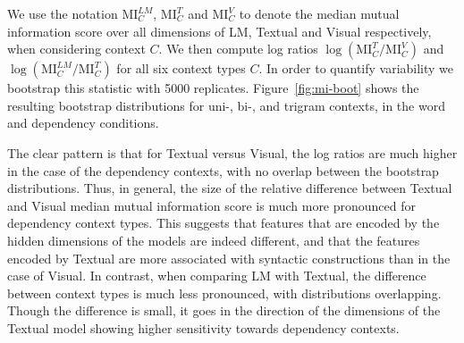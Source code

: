 We use the notation $\mathrm{MI}^\mathit{LM}_C$,  $\mathrm{MI}^T_C$ and  $\mathrm{MI}^V_C$ 
to denote the median mutual information score over all dimensions of {\sc LM}, {\sc Textual} and {\sc Visual} 
respectively, when considering context $C$. 
We then compute log ratios $\log(\mathrm{MI}^{T}_{C}/\mathrm{MI}^{V}_{C})$ and $\log(\mathrm{MI}^\mathit{LM}_{C}/\mathrm{MI}^{T}_{C})$
for all six context types $C$. In order to quantify variability we bootstrap this statistic with
5000 replicates. Figure~\ref{fig:mi-boot} shows the resulting bootstrap distributions 
for uni-, bi-, and trigram contexts, in the word and dependency conditions. 


The clear pattern is that for {\sc Textual} versus {\sc Visual}, the
log ratios are much higher in the case of the dependency contexts,
with no overlap between the bootstrap distributions. Thus, in general,
the size of the relative difference between {\sc Textual} and {\sc
  Visual} median mutual information score is much more pronounced for
dependency context types.  This suggests that features that are
encoded by the hidden dimensions of the models are indeed different, and
that the features encoded by {\sc Textual} are more associated with
syntactic constructions than in the case of {\sc Visual}. In contrast,
when comparing {\sc LM} with {\sc Textual}, the difference between
context types is much less pronounced, with distributions
overlapping. Though the difference is small, it goes in the direction
of the dimensions of the {\sc Textual} model showing higher
sensitivity towards dependency contexts.

